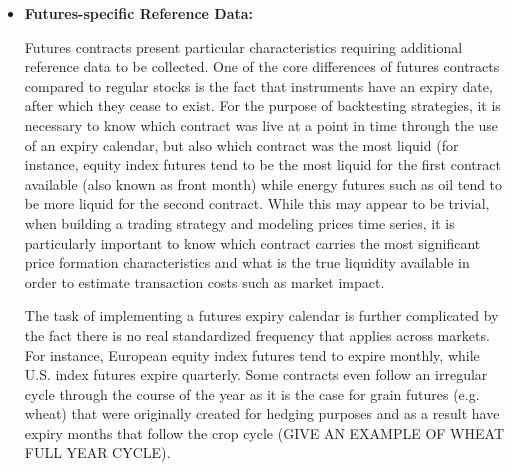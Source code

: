 \begin{itemize}
\item \textbf{Futures-specific Reference Data:} 

Futures contracts present particular characteristics requiring additional reference data to be collected. One of the core differences of futures contracts compared to regular stocks is the fact that instruments have an expiry date, after which they cease to exist. For the purpose of backtesting strategies, it is necessary to know which contract was live at a point in time through the use of an expiry calendar, but also which contract was the most liquid (for instance, equity index futures tend to be the most liquid for the first contract available (also known as front month) while energy futures such as oil tend to be more liquid for the second contract. While this may appear to be trivial, when building a trading strategy and modeling prices time series, it is particularly important to know which contract carries the most significant price formation characteristics and what is the true liquidity available in order to estimate transaction costs such as market impact. 

The task of implementing a futures expiry calendar is further complicated by the fact there is no real standardized frequency that applies across markets. For instance, European equity index futures tend to expire monthly, while U.S. index futures expire quarterly. Some contracts even follow an irregular cycle through the course of the year as it is the case for grain futures (e.g. wheat) that were originally created for hedging purposes and as a result have expiry months that follow the crop cycle (GIVE AN EXAMPLE OF WHEAT FULL YEAR CYCLE).


\end{itemize}
